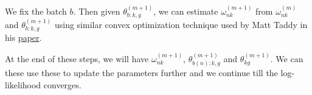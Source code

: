 \documentclass[]{article}
\begin{document}
We fix the batch \(b\). Then given \(\theta^{(m+1)}_{b:k,g}\), we can
estimate \(\omega^{(m+1)}_{nk}\) from \(\omega^{(m)}_{nk}\) and
\(\theta^{(m+1)}_{b:k,g}\) using similar convex optimization technique
used by Matt Taddy in his
\href{http://arxiv.org/pdf/1109.4518v3.pdf}{paper}.

At the end of these steps, we will have \(\omega^{(m+1)}_{nk}\),
\(\theta^{(m+1)}_{b(n):k,g}\) and \(\theta^{(m+1)}_{kg}\). We can these
use these to update the parameters further and we continue till the
log-likelihood converges.
\end{document}
